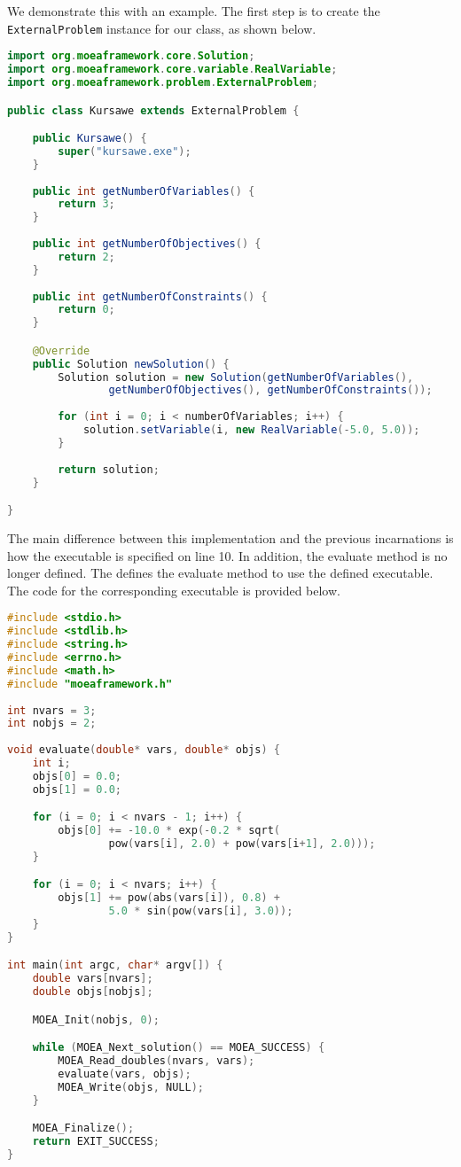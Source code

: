 We demonstrate this with an example.  The first step is to create the \texttt{ExternalProblem} instance for our class, as shown below.

\begin{lstlisting}[language=Java]
import org.moeaframework.core.Solution;
import org.moeaframework.core.variable.RealVariable;
import org.moeaframework.problem.ExternalProblem;

public class Kursawe extends ExternalProblem {

	public Kursawe() {
		super("kursawe.exe");
	}
	
	public int getNumberOfVariables() {
		return 3;
	}
	
	public int getNumberOfObjectives() {
		return 2;
	}
	
	public int getNumberOfConstraints() {
		return 0;
	}

	@Override
	public Solution newSolution() {
		Solution solution = new Solution(getNumberOfVariables(), 
				getNumberOfObjectives(), getNumberOfConstraints());
 
		for (int i = 0; i < numberOfVariables; i++) {
			solution.setVariable(i, new RealVariable(-5.0, 5.0));
		}
 
		return solution;
	}

}
\end{lstlisting}

The main difference between this implementation and the previous incarnations is how the executable is specified on line 10.  In addition, the evaluate method is no longer defined.  The  defines the evaluate method to use the defined executable.  The code for the corresponding executable is provided below.

\begin{lstlisting}[language=C]
#include <stdio.h>
#include <stdlib.h>
#include <string.h>
#include <errno.h>
#include <math.h>
#include "moeaframework.h"
 
int nvars = 3;
int nobjs = 2;
 
void evaluate(double* vars, double* objs) {
	int i;
	objs[0] = 0.0;
	objs[1] = 0.0;

	for (i = 0; i < nvars - 1; i++) {
		objs[0] += -10.0 * exp(-0.2 * sqrt(
				pow(vars[i], 2.0) + pow(vars[i+1], 2.0)));
	}

	for (i = 0; i < nvars; i++) {
		objs[1] += pow(abs(vars[i]), 0.8) +  
				5.0 * sin(pow(vars[i], 3.0));
	}
}

int main(int argc, char* argv[]) {
	double vars[nvars];
	double objs[nobjs];

	MOEA_Init(nobjs, 0);

	while (MOEA_Next_solution() == MOEA_SUCCESS) {
		MOEA_Read_doubles(nvars, vars);
		evaluate(vars, objs);
		MOEA_Write(objs, NULL);
	}

	MOEA_Finalize();
	return EXIT_SUCCESS;
}
\end{lstlisting}

